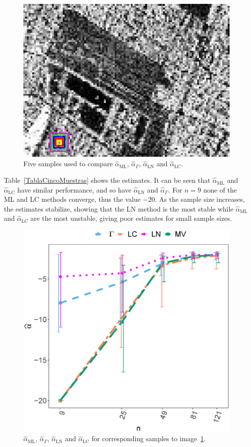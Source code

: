 \documentclass[twocolumn]{svjour3}
\begin{document}
	\begin{figure}[hbt]
		\centering
		\includegraphics[width=0.7\linewidth]{../../../Figures/PaperTesis/CincoMuestras.eps}
		\caption{Five samples used to compare $\widehat{\alpha}_{\text{{ML}}}$, $\widehat{\alpha}_{\Gamma}$, $\widehat{\alpha}_{\text{{LN}}}$ and  $\widehat{\alpha}_{\text{{LC}}}$.}\label{CincoMuestras}
	\end{figure}
	
	Table~\ref{TablaCincoMuestras} shows the estimates. 
	It can be seen that $\widehat{\alpha}_{\text{{ML}}}$ and $\widehat{\alpha}_{\text{{LC}}}$ have similar performance, and so have $\widehat{\alpha}_{\text{{LN}}}$ and $\widehat{\alpha}_{\Gamma}$. 
	For $n= 9$ none of the ML and LC methods converge, thus the value $-20$. 
	As the sample size increases, the estimates stabilize, showing that the LN method is the most stable while $\widehat{\alpha}_{\text{{ML}}}$ and $\widehat{\alpha}_{\text{{LC}}}$ are the most unstable, giving poor estimates for small sample sizes.
	
	\begin{figure}[hbt]
		\centering
		\includegraphics[width=0.7\linewidth]{../../../Figures/PaperTesis/AlfaVsTamCincoMuestras_v2.eps}
		\caption{ $\widehat{\alpha}_{\text{{ML}}}$, $\widehat{\alpha}_{\Gamma}$, $\widehat{\alpha}_{\text{{LN}}}$ and $\widehat{\alpha}_{\text{{LC}}}$ for corresponding samples to image~\ref{CincoMuestras}.}\label{AlfaVsTamCincoMuestras}
	\end{figure}
	
\end{document}
